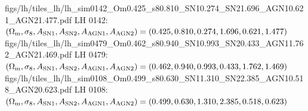 \documentclass{article}
\newcommand{\FILL}[1]{\textcolor{red}{\textbf{[#1]}}}
\newcommand{\Mcdm}{M_{\rm cdm}}
\newcommand{\Mgas}{M_{\rm gas}}
\newcommand{\Tgas}{T}
\newcommand{\Om}{\Omega_{\rm m}}
\newcommand{\sig}{\sigma_8}
\begin{document}
\clearpage
\begin{center}
\vspace*{\fill}
\AppendixLHTile
  {figs/lh/tiles_lh/lh_sim0142_Om0.425_s80.810_SN10.274_SN21.696_AGN10.621_AGN21.477.pdf}
  {LH 0142: $(\Om,\sig,A_{\rm SN1},A_{\rm SN2},A_{\rm AGN1},A_{\rm AGN2})
  =(0.425,0.810,0.274,1.696,0.621,1.477)$}
\AppendixLHTile
  {figs/lh/tiles_lh/lh_sim0479_Om0.462_s80.940_SN10.993_SN20.433_AGN11.762_AGN21.469.pdf}
  {LH 0479: $(\Om,\sig,A_{\rm SN1},A_{\rm SN2},A_{\rm AGN1},A_{\rm AGN2})
  =(0.462,0.940,0.993,0.433,1.762,1.469)$}
\AppendixLHTile
  {figs/lh/tiles_lh/lh_sim0108_Om0.499_s80.630_SN11.310_SN22.385_AGN10.518_AGN20.623.pdf}
  {LH 0108: $(\Om,\sig,A_{\rm SN1},A_{\rm SN2},A_{\rm AGN1},A_{\rm AGN2})
  =(0.499,0.630,1.310,2.385,0.518,0.623)$}
\vspace*{\fill}
\end{center}



\end{document}
